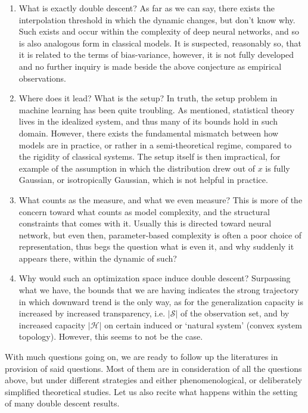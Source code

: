 \begin{enumerate}
    \item What is exactly double descent? As far as we can say, there exists the interpolation threshold in which the dynamic changes, but don't know why. Such exists and occur within the complexity of deep neural networks, and so is also analogous form in classical models. It is suspected, reasonably so, that it is related to the terms of bias-variance, however, it is not fully developed and no further inquiry is made beside the above conjecture as empirical observations. 
    \item Where does it lead? What is the setup? In truth, the setup problem in machine learning has been quite troubling. As mentioned, statistical theory lives in the idealized system, and thus many of its bounds hold in such domain. However, there exists the fundamental mismatch between how models are in practice, or rather in a semi-theoretical regime, compared to the rigidity of classical systems. The setup itself is then impractical, for example of the assumption in which the distribution drew out of $x$ is fully Gaussian, or isotropically Gaussian, which is not helpful in practice. 
    \item What counts as the measure, and what we even measure? This is more of the concern toward what counts as model complexity, and the structural constraints that comes with it. Usually this is directed toward neural network, but even then, parameter-based complexity is often a poor choice of representation, thus begs the question what is even it, and why suddenly it appears there, within the dynamic of such?
    \item Why would such an optimization space induce double descent? Surpassing what we have, the bounds that we are having indicates the strong trajectory in which downward trend is the only way, as for the generalization capacity is increased by increased transparency, i.e. $|\mathcal{S}|$ of the observation set, and by increased capacity $|\mathcal{H}|$ on certain induced or `natural system' (convex system topology). However, this seems to not be the case. 
\end{enumerate}

With much questions going on, we are ready to follow up the literatures in provision of said questions. Most of them are in consideration of all the questions above, but under different strategies and either phenomenological, or deliberately simplified theoretical studies. Let us also recite what happens within the setting of many double descent results. 

